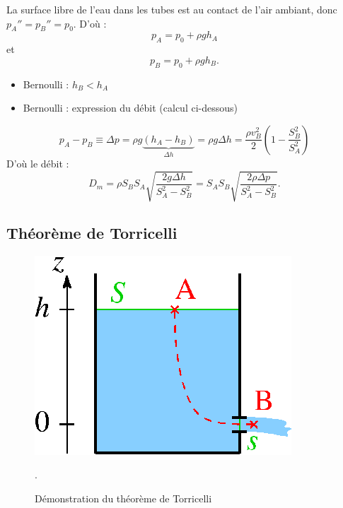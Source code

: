 \documentclass[11pt,a4paper]{report}
\begin{document}
La surface libre de l'eau dans les tubes est au contact de l'air ambiant, donc $p_A'' = p_B'' = p_0$. D'où :
\begin{equation}
	p_A = p_0 + \rho g h_A
\end{equation}
et
\begin{equation}
	p_B = p_0 + \rho g h_B.
\end{equation}

	\begin{itemize}
		\item Bernoulli : $h_B < h_A$
		\item Bernoulli : expression du débit (calcul ci-dessous)
	\end{itemize}

\begin{equation}
	p_A - p_B \equiv \Delta p = \rho g \underbrace{\left(h_A - h_B\right)}_{\Delta h} = \rho g \Delta h = \frac{\rho v_B^2}{2}\left(1 - \frac{S_B^2}{S_A^2}\right)
\end{equation}
D'où le débit :
\begin{equation}
	D_m = \rho S_B S_A \sqrt{\frac{2g\Delta h}{S_A^2 - S_B^2}} = S_A S_B \sqrt{\frac{2\rho \Delta p}{S_A^2 - S_B^2}}.
\end{equation}

\subsection{Théorème de Torricelli}
\begin{figure}[h!]
\begin{center}
	\includegraphics[scale = 0.3]{torricelli.png}
	\caption{Démonstration du théorème de Torricelli}. 
	\label{fig:torricelli}
\end{center}
\end{figure}
\end{document}
